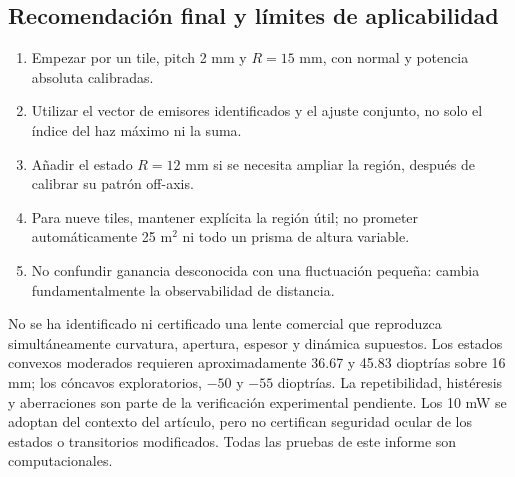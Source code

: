 \subsection{Recomendación final y límites de aplicabilidad}
\begin{enumerate}
\item Empezar por un tile, pitch 2 mm y $R=15$ mm, con normal y potencia absoluta calibradas.
\item Utilizar el vector de emisores identificados y el ajuste conjunto, no solo el índice del haz máximo ni la suma.
\item Añadir el estado $R=12$ mm si se necesita ampliar la región, después de calibrar su patrón off-axis.
\item Para nueve tiles, mantener explícita la región útil; no prometer automáticamente 25 m$^2$ ni todo un prisma de altura variable.
\item No confundir ganancia desconocida con una fluctuación pequeña: cambia fundamentalmente la observabilidad de distancia.
\end{enumerate}

No se ha identificado ni certificado una lente comercial que reproduzca simultáneamente curvatura, apertura, espesor y dinámica supuestos. Los estados convexos moderados requieren aproximadamente 36.67 y 45.83 dioptrías sobre 16 mm; los cóncavos exploratorios, $-50$ y $-55$ dioptrías. La repetibilidad, histéresis y aberraciones son parte de la verificación experimental pendiente. Los 10 mW se adoptan del contexto del artículo, pero no certifican seguridad ocular de los estados o transitorios modificados. Todas las pruebas de este informe son computacionales.
